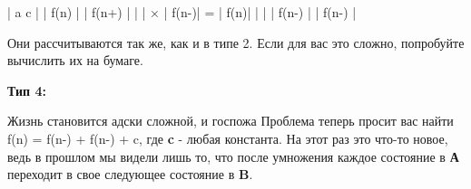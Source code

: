 \vspace{\baselineskip}
\begin{tcolorbox}
|\hspace{1,5mm} a \hspace{3mm}   \hspace{3mm} c \hspace{0,5mm}| \hspace{11mm}| \hspace{3mm} f(n) \hspace{3mm}|\hspace{16mm} |\hspace*{2,5mm} f(n+)\hspace*{2,9mm} |\newline
|\hspace{1,5mm} \hspace{6mm}\hspace{6mm}\hspace{0mm} |\hspace*{3mm} $\times$\hspace{3mm}     |\hspace*{2,5mm} f(n-)\hspace*{2,9mm}|\hspace{5mm} = \hspace*{5mm}    |\hspace*{6mm} f(n)\hspace*{6mm}|\newline
|\hspace{1,5mm}  \hspace{3mm}   \hspace{3mm}  \hspace{0,5mm}| \hspace{10,7mm}| \hspace{1,7mm} f(n-) \hspace{1mm}|\hspace{16mm} |\hspace*{2,5mm} f(n-)\hspace*{4,5mm} |
\end{tcolorbox}

\vspace{\baselineskip}
Они рассчитываются так же, как и в типе 2. Если для вас это сложно, попробуйте вычислить их на бумаге.

\vspace{\baselineskip}

\textbf{Тип 4:}

\vspace{\baselineskip}
Жизнь становится адски сложной, и госпожа Проблема теперь просит вас найти f(n) = f(n-) + f(n-) + c, где \textbf{c} - любая константа.\newline
На этот раз это что-то новое, ведь в прошлом мы видели лишь то, что после умножения каждое состояние в \textbf{А}  переходит в свое следующее состояние в \textbf{B}.

